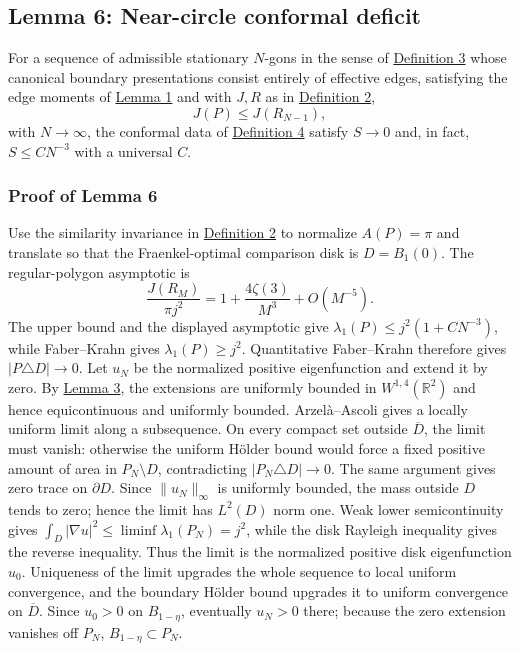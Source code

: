 \documentclass[11pt]{article}
\begin{document}
\subsection{Lemma 6: Near-circle conformal
deficit}\label{lem-near-circle-conformal}

For a sequence of admissible stationary \(N\)-gons in the sense of
\hyperref[def-stationary-polygon]{Definition 3} whose canonical boundary
presentations consist entirely of effective edges, satisfying the edge
moments of \hyperref[lem-edge-moments]{Lemma 1} and with \(J,R\) as in
\hyperref[def-j-functional]{Definition 2}, \[
J(P)\le J(R_{N-1}),
\] with \(N\to\infty\), the conformal data of
\hyperref[def-conformal-data]{Definition 4} satisfy \(S\to0\) and, in
fact, \(S\le C N^{-3}\) with a universal \(C\).

\subsubsection{Proof of Lemma 6}\label{proof-lem-near-circle-conformal}

Use the similarity invariance in \hyperref[def-j-functional]{Definition
2} to normalize \(A(P)=\pi\) and translate so that the Fraenkel-optimal
comparison disk is \(D=B_1(0)\). The regular-polygon asymptotic is \[
\frac{J(R_M)}{\pi j^2}=1+\frac{4\zeta(3)}{M^3}+O(M^{-5}).
\] The upper bound and the displayed asymptotic give
\(\lambda_1(P)\le j^2(1+CN^{-3})\), while Faber--Krahn gives
\(\lambda_1(P)\ge j^2\). Quantitative Faber--Krahn therefore gives
\(|P\triangle D|\to0\). Let \(u_N\) be the normalized positive
eigenfunction and extend it by zero. By \hyperref[lem-uniform-w14]{Lemma
3}, the extensions are uniformly bounded in \(W^{1,4}(\mathbb R^2)\) and
hence equicontinuous and uniformly bounded. Arzelà--Ascoli gives a
locally uniform limit along a subsequence. On every compact set outside
\(\overline D\), the limit must vanish: otherwise the uniform Hölder
bound would force a fixed positive amount of area in \(P_N\setminus D\),
contradicting \(|P_N\triangle D|\to0\). The same argument gives zero
trace on \(\partial D\). Since \(\|u_N\|_\infty\) is uniformly bounded,
the mass outside \(D\) tends to zero; hence the limit has \(L^2(D)\)
norm one. Weak lower semicontinuity gives
\(\int_D|\nabla u|^2\le\liminf\lambda_1(P_N)=j^2\), while the disk
Rayleigh inequality gives the reverse inequality. Thus the limit is the
normalized positive disk eigenfunction \(u_0\). Uniqueness of the limit
upgrades the whole sequence to local uniform convergence, and the
boundary Hölder bound upgrades it to uniform convergence on
\(\overline D\). Since \(u_0>0\) on \(B_{1-\eta}\), eventually \(u_N>0\)
there; because the zero extension vanishes off \(P_N\),
\(B_{1-\eta}\subset P_N\).
\end{document}

